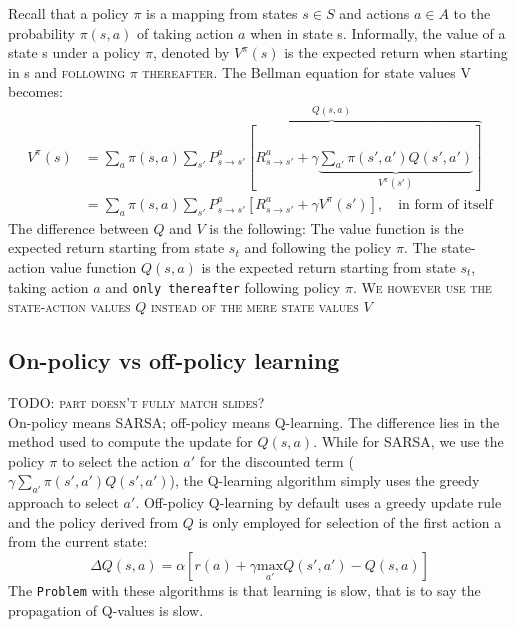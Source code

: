 \documentclass[11pt]{article}
\begin{document}
Recall that a policy $\pi$ is a mapping from states $s \in S$ and actions $a \in A$ to the probability $\pi(s,a)$ of taking action $a$ when in state s. Informally, the value of a state s under a
policy $\pi$, denoted by $V^\pi(s)$ is the expected return when starting in s and \textsc{following $\pi$ thereafter}. %
The Bellman equation for state values V becomes:
\begin{align*}
	V^{\pi}(s)&=\sum_a \pi(s,a) \overbrace{\sum_{s'} P^a_{s \rightarrow s'} [R^a_{s \rightarrow s'} + \gamma \underbrace{\sum_{a'}\pi(s',a')Q(s',a')}_{V^\pi(s')}]}^{Q(s,a)}\\
	&=\sum_a \pi(s,a) \sum_{s'} P_{s \rightarrow s'}^a[R_{s \rightarrow s'}^a + \gamma V^{\pi}(s')],\quad\text{in form of itself}
\end{align*}
The difference between $Q$ and $V$ is the following: The value function is the expected return starting from state $s_t$ and following the policy $\pi$. The state-action value function $Q(s,a)$ is the expected return starting from state $s_t$, taking action $a$ and \texttt{only thereafter} following policy $\pi$.
\textsc{We however use the state-action values $Q$ instead of the mere state values $V$}

\subsection{On-policy vs off-policy learning}
\textsc{TODO: part doesn't fully match slides?}\\
On-policy means SARSA; off-policy means Q-learning. The difference lies in the method used to compute the update for $Q(s,a)$. While for SARSA, we use the policy $\pi$ to select the action $a'$ for the discounted term ($\gamma \sum_{a'} \pi(s',a')Q(s',a')$), the Q-learning algorithm simply uses the greedy approach to select $a'$. Off-policy Q-learning by default uses a greedy update rule and the policy derived from $Q$ is only employed for selection of the first action a from the current state:
\[
\Delta Q(s,a)=\alpha\left[r(a)+\gamma\underset{a'}{\text{max}} Q(s',a')-Q(s,a)\right]
\]
The \texttt{Problem} with these algorithms is that learning is slow, that is to say the propagation of Q-values is slow.
\end{document}
